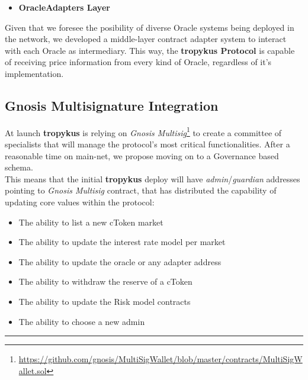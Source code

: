 \documentclass{article}
\begin{document}
\begin{itemize}
\item\textbf{OracleAdapters Layer}
\end{itemize}

Given that we foresee the posibility of diverse Oracle systems being deployed in the network, we developed a middle-layer contract adapter system to interact with each Oracle as intermediary. This way, the \textbf{tropykus Protocol} is capable of receiving price information from every kind of Oracle, regardless of it's implementation.

\subsection{Gnosis Multisignature Integration}

At launch \textbf{tropykus} is relying on \textit{Gnosis Multisig}\footnote{\href{https://github.com/gnosis/MultiSigWallet/blob/master/contracts/MultiSigWallet.sol}{https://github.com/gnosis/MultiSigWallet/blob/master/contracts/MultiSigWallet.sol}} to create a committee of specialists that will manage the protocol's most critical functionalities. After a reasonable time on main-net, we propose moving on to a Governance based schema.\\
This means that the initial \textbf{tropykus} deploy will have \textit{admin}/\textit{guardian} addresses pointing to \textit{Gnosis Multisig} contract, that has distributed the capability of updating core values within the protocol:

\begin{itemize}
\item The ability to list a new cToken market
\item The ability to update the interest rate model per market
\item The ability to update the oracle or any adapter address
\item The ability to withdraw the reserve of a cToken
\item The ability to update the Risk model contracts
\item The ability to choose a new admin
\end{itemize}

\begin{center}
\noindent\rule{8cm}{0.4pt}
\end{center}

\end{document}

